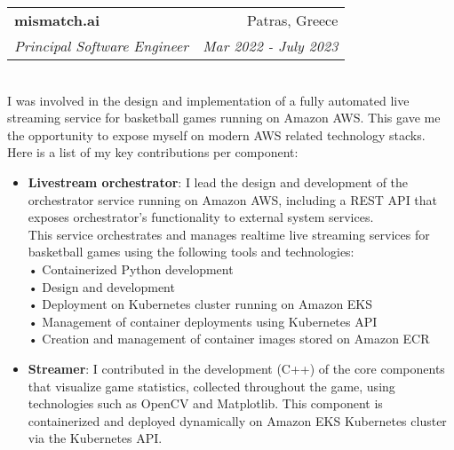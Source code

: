 \documentclass[letterpaper,10pt]{article}
\makeatletter
\newcommand{\resumeItem}[2]{
  \item\small{
    \textbf{#1}{: #2 \vspace{-2pt}}
  }
}
\newcommand{\resumeSubheading}[4]{
  \vspace{-1pt}\item
    \begin{tabular*}{0.97\textwidth}[t]{l@{\extracolsep{\fill}}r}
      \textbf{#1} & #2 \\
      \textit{\small#3} & \textit{\small #4} \\
    \end{tabular*}\vspace{-5pt}
}
\newcommand{\resumeItemListStart}{\begin{itemize}}
\newcommand{\resumeItemListEnd}{\end{itemize}\vspace{-5pt}}
\makeatother
\begin{document}
    \resumeSubheading
    {mismatch.ai}{Patras, Greece}
    {Principal Software Engineer}{Mar 2022 - July 2023}
    \newline \\I was involved in the design and implementation of a fully automated live streaming service for basketball games running on Amazon AWS. This gave me the opportunity to expose myself on modern AWS related technology stacks.\\
    Here is a list of my key contributions per component:
    \resumeItemListStart
      \resumeItem{Livestream orchestrator}
        {I lead the design and development of the orchestrator service running on Amazon AWS, including a REST API that exposes orchestrator's functionality to external system services.\\
        This service orchestrates and manages realtime live streaming services for basketball games using the following tools and technologies:\\
        • Containerized Python development\\
        • Design and development\\
        • Deployment on Kubernetes cluster running on Amazon EKS\\
        • Management of container deployments using Kubernetes API\\
        • Creation and management of container images stored on Amazon ECR\\
        }
      \resumeItem{Streamer}
        {I contributed in the development (C++) of the core components that visualize game statistics, collected throughout the game, using technologies such as OpenCV and Matplotlib. This component is containerized and deployed dynamically on Amazon EKS Kubernetes cluster via the Kubernetes API.
        }
    \resumeItemListEnd
\end{document}
